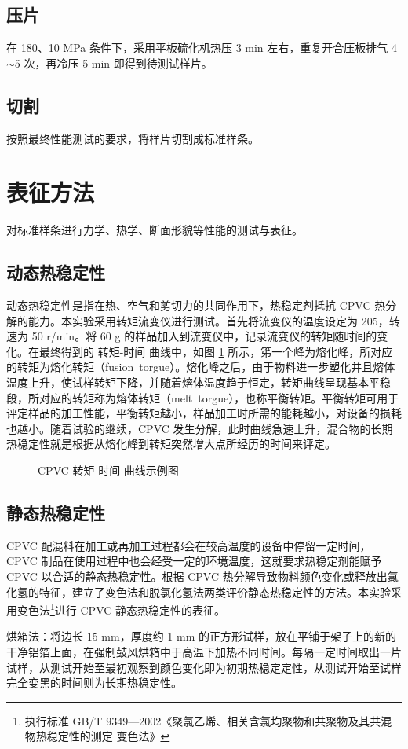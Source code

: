 \subsection{压片}
在 180\cd、10 MPa 条件下，采用平板硫化机热压 3 min 左右，重复开合压板排气 4$\sim$5 次，再冷压 5 min 即得到待测试样片。

\subsection{切割}
按照最终性能测试的要求，将样片切割成标准样条。


\section{表征方法}
对标准样条进行力学、热学、断面形貌等性能的测试与表征。

\subsection{动态热稳定性}\label{sectionHakee}
动态热稳定性是指在热、空气和剪切力的共同作用下，热稳定剂抵抗 CPVC 热分解的能力。本实验采用转矩流变仪进行测试。首先将流变仪的温度设定为 205\cd，转速为 50 r/min。将 60 g 的样品加入到流变仪中，记录流变仪的转矩随时间的变化。在最终得到的 转矩-时间 曲线中，如图 \ref{figExHakee} 所示，笫一个峰为熔化峰，所对应的转矩为熔化转矩（fusion torgue）。熔化峰之后，由于物料进一步塑化并且熔体温度上升，使试样转矩下降，并随着熔体温度趋于恒定，转矩曲线呈现基本平稳段，所对应的转矩称为熔体转矩（melt torgue），也称平衡转矩。平衡转矩可用于评定样品的加工性能，平衡转矩越小，样品加工时所需的能耗越小，对设备的损耗也越小。随着试验的继续，CPVC 发生分解，此时曲线急速上升，混合物的长期热稳定性就是根据从熔化峰到转矩突然增大点所经历的时间来评定。

\begin{figure}[!htbp]
    \begin{center}
        
    \end{center}
    \caption{CPVC 转矩-时间 曲线示例图}
    \label{figExHakee}
\end{figure}

\subsection{静态热稳定性}
CPVC 配混料在加工或再加工过程都会在较高温度的设备中停留一定时间，CPVC 制品在使用过程中也会经受一定的环境温度，这就要求热稳定剂能赋予 CPVC 以合适的静态热稳定性。根据 CPVC 热分解导致物料颜色变化或释放出氯化氢的特征，建立了变色法和脱氯化氢法两类评价静态热稳定性的方法。本实验采用变色法\footnote{执行标准 GB/T 9349—2002《聚氯乙烯、相关含氯均聚物和共聚物及其共混物热稳定性的测定 变色法》}进行 CPVC 静态热稳定性的表征。\par
烘箱法：将边长 15 mm，厚度约 1 mm 的正方形试样，放在平铺于架子上的新的干净铝箔上面，在强制鼓风烘箱中于高温下加热不同时间。每隔一定时间取出一片试样，从测试开始至最初观察到颜色变化即为初期热稳定定性，从测试开始至试样完全变黑的时间则为长期热稳定性。

